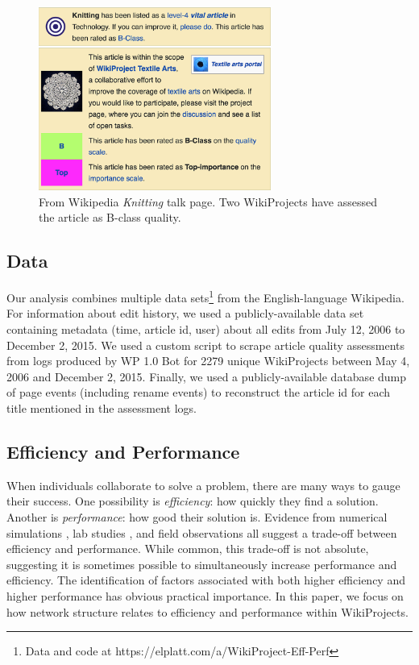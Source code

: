 \begin{figure}[h!]
\begin{center}
\includegraphics[width=3in]{fig-knitting.png}
\caption{
From Wikipedia {\em Knitting} talk page.
Two WikiProjects have assessed the article as B-class quality.
\label{fig:knitting}
}
\end{center}
\end{figure}

\subsection{Data}

Our analysis combines multiple data
sets\footnote{Data and code at https://elplatt.com/a/WikiProject-Eff-Perf}
from the English-language Wikipedia.
For information about edit history, we used a publicly-available data set containing
metadata (time, article id, user) about all edits from July 12, 2006 to December 2, 2015.
We used a custom script to scrape article quality assessments from logs produced
by WP 1.0 Bot for 2279 unique WikiProjects
between May 4, 2006 and December 2, 2015.
Finally, we used a publicly-available database dump of page events (including rename events)
to reconstruct the article id for each title mentioned in the assessment logs.

\subsection{Efficiency and Performance}

When individuals collaborate to solve a problem,
there are many ways to gauge their success.
One possibility is {\em efficiency}:
how quickly they find a solution.
Another is {\em performance}:
how good their solution is.
Evidence from numerical simulations
\cite{lazer_network_2007,mason_propagation_2008,mason_collaborative_2012,grim_scientific_2013,barkoczi_social_2016},
lab studies \cite{kearns_experiments_2012},
and field observations \cite{gentry_consensus_1982}
all suggest a trade-off between efficiency and performance.
While common, this trade-off is not absolute,
suggesting it is sometimes possible to simultaneously increase
performance and efficiency.
The identification of factors associated with both higher efficiency
and higher performance has obvious practical importance.
In this paper, we focus on how network structure
relates to efficiency and performance within WikiProjects.

